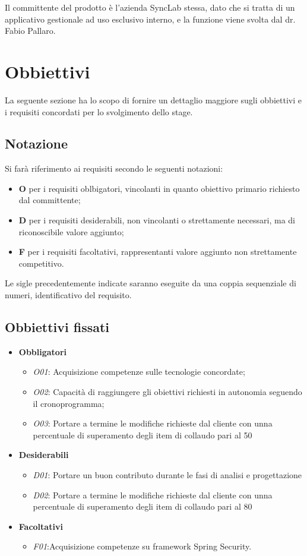 Il committente del prodotto è l'azienda SyncLab stessa, dato che si tratta di un applicativo gestionale ad uso esclusivo interno, e la funzione viene svolta dal dr. Fabio Pallaro.

\section{Obbiettivi}
La seguente sezione ha lo scopo di fornire un dettaglio maggiore sugli obbiettivi e i requisiti concordati per lo svolgimento dello stage.

\subsection{Notazione}
Si farà riferimento ai requisiti secondo le seguenti notazioni:
\begin{itemize}
	\item \textbf{O} per i requisiti oblbigatori, vincolanti in quanto obiettivo primario richiesto
	dal committente;
	\item \textbf{D} per i requisiti desiderabili, non vincolanti o strettamente necessari, ma di
	riconoscibile valore aggiunto;
	\item \textbf{F} per i requisiti facoltativi, rappresentanti valore aggiunto non strettamente
	competitivo.
\end{itemize}
Le sigle precedentemente indicate saranno eseguite da una coppia sequenziale di
numeri, identificativo del requisito.
\subsection{Obbiettivi fissati}

\begin{itemize}
	\item \textbf{Obbligatori}
	\begin{itemize}
		\item 
		\textit{O01}: Acquisizione competenze sulle tecnologie  concordate;
		\item 
		\textit{O02}: Capacità di raggiungere gli obiettivi richiesti in autonomia seguendo il cronoprogramma;
		\item
		\textit{O03}: Portare a termine le modifiche richieste dal cliente con unna percentuale di superamento degli item di collaudo pari al 50
		
	\end{itemize}
	\item \textbf{Desiderabili}
	\begin{itemize}
		\item 
		 \textit{D01}: Portare un buon contributo durante le fasi di analisi e progettazione
		\item 
		 \textit{D02}: Portare a termine le modifiche richieste dal cliente con unna percentuale di superamento degli item di collaudo pari al 80
	\end{itemize}
	\item \textbf{Facoltativi}
	\begin{itemize}
		\item \textit{F01}:Acquisizione competenze su framework Spring Security.
	\end{itemize}
	
\end{itemize}
